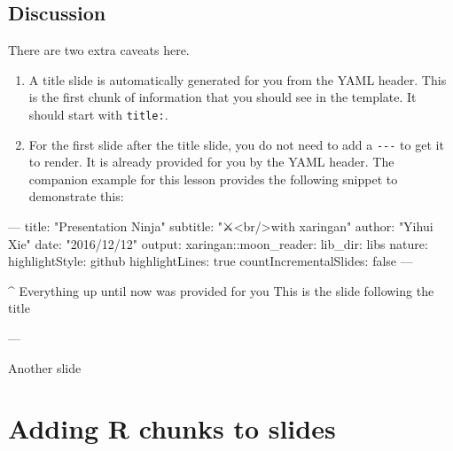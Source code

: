 \documentclass[]{book}
\newenvironment{Shaded}{\begin{snugshade}}{\end{snugshade}}
\newcommand{\ExtensionTok}[1]{#1}
\newcommand{\NormalTok}[1]{#1}
\newcommand{\StringTok}[1]{\textcolor[rgb]{0.31,0.60,0.02}{#1}}
\theoremstyle{definition}
\theoremstyle{definition}
\theoremstyle{definition}
\theoremstyle{remark}
\begin{document}
\hypertarget{discussion-2}{%
\section{Discussion}\label{discussion-2}}

There are two extra caveats here.

\begin{enumerate}
\def\labelenumi{\arabic{enumi})}
\item
  A title slide is automatically generated for you from the YAML header.
  This is the first chunk of information that you should see in the
  template. It should start with \texttt{title:}.
\item
  For the first slide after the title slide, you do not need to add a
  \texttt{-\/-\/-} to get it to render. It is already provided for you
  by the YAML header. The companion example for this lesson provides the
  following snippet to demonstrate this:
\end{enumerate}

\begin{Shaded}
\begin{Highlighting}[]
\ExtensionTok{---}
\ExtensionTok{title}\NormalTok{: }\StringTok{"Presentation Ninja"}
\ExtensionTok{subtitle}\NormalTok{: }\StringTok{"⚔<br/>with xaringan"}
\ExtensionTok{author}\NormalTok{: }\StringTok{"Yihui Xie"}
\ExtensionTok{date}\NormalTok{: }\StringTok{"2016/12/12"}
\ExtensionTok{output}\NormalTok{:}
  \ExtensionTok{xaringan}\NormalTok{::moon_reader:}
    \ExtensionTok{lib_dir}\NormalTok{: libs}
    \ExtensionTok{nature}\NormalTok{:}
      \ExtensionTok{highlightStyle}\NormalTok{: github}
      \ExtensionTok{highlightLines}\NormalTok{: true}
      \ExtensionTok{countIncrementalSlides}\NormalTok{: false}
\ExtensionTok{---}

\NormalTok{^ }\ExtensionTok{Everything}\NormalTok{ up until now was provided for you}
\ExtensionTok{This}\NormalTok{ is the slide following the title}

\ExtensionTok{---}

\ExtensionTok{Another}\NormalTok{ slide}
\end{Highlighting}
\end{Shaded}

\hypertarget{adding-r-chunks-to-slides}{%
\chapter{Adding R chunks to slides}\label{adding-r-chunks-to-slides}}
\end{document}
